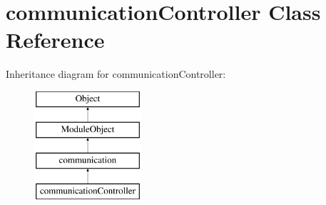 \hypertarget{classcommunicationController}{\section{communication\-Controller Class Reference}
\label{classcommunicationController}
}
Inheritance diagram for communication\-Controller\-:\begin{figure}[H]
\begin{center}
\leavevmode
\includegraphics[height=4.000000cm]{classcommunicationController}
\end{center}
\end{figure}
